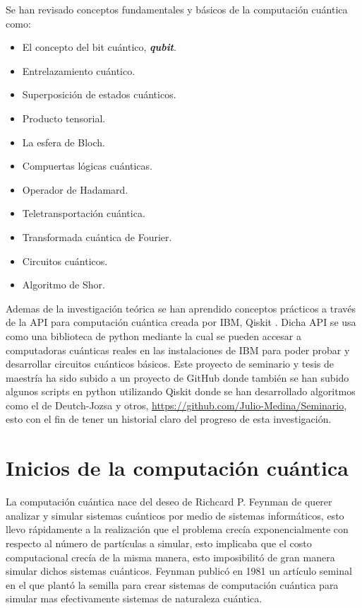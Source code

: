 \documentclass[a4paper]{article}
\begin{document}
Se han revisado conceptos fundamentales y básicos de la computación cuántica como:
\begin{itemize}
\item El concepto del bit cuántico, \textbf{\textit{qubit}}.
\item Entrelazamiento cuántico.
\item Superposición de estados cuánticos.
\item Producto tensorial.
\item La esfera de Bloch.
\item Compuertas lógicas cuánticas.
\item Operador de Hadamard.
\item Teletransportación cuántica.
\item Transformada cuántica de Fourier.
\item Circuitos cuánticos.
\item Algoritmo de Shor.

\end{itemize} 
Ademas de la investigación teórica se han aprendido conceptos prácticos a través de la API para computación cuántica creada por IBM, Qiskit \cite{Qiskit}. Dicha API se usa como una biblioteca de python mediante la cual se pueden accesar a computadoras cuánticas reales en las instalaciones de IBM para poder probar y desarrollar circuitos cuánticos básicos. Este proyecto de seminario y tesis de maestría ha sido subido a un proyecto de GitHub donde también se han subido algunos scripts en python utilizando Qiskit donde se han desarrollado algoritmos como el de Deutch-Jozsa y otros, \url{https://github.com/Julio-Medina/Seminario}, esto con el fin de tener un historial claro del progreso de esta investigación.

\section{Inicios de la computación cuántica}
 La computación cuántica nace del deseo de Richcard P. Feynman de querer analizar y simular sistemas cuánticos por medio de sistemas informáticos, esto llevo rápidamente a la realización que el problema crecía exponencialmente con respecto al número de partículas a simular, esto implicaba que el costo computacional crecía de la misma manera, esto imposibilitó de gran manera simular dichos sistemas cuánticos. Feynman\cite{Feynman} publicó en 1981 un artículo seminal en el que plantó la semilla para crear sistemas de computación cuántica para simular mas efectivamente sistemas de naturaleza cuántica. \\
 
\end{document}
